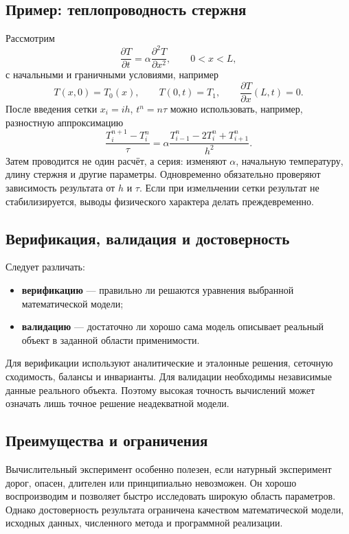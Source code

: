 \subsection{Пример: теплопроводность стержня}

Рассмотрим
\[
\frac{\partial T}{\partial t}
=\alpha\frac{\partial^2T}{\partial x^2},
\qquad 0<x<L,
\]
с начальными и граничными условиями, например
\[
T(x,0)=T_0(x),\qquad
T(0,t)=T_1,
\qquad
\frac{\partial T}{\partial x}(L,t)=0.
\]
После введения сетки $x_i=ih$, $t^n=n\tau$ можно использовать, например,
разностную аппроксимацию
\[
\frac{T_i^{n+1}-T_i^n}{\tau}
=\alpha\frac{T_{i-1}^n-2T_i^n+T_{i+1}^n}{h^2}.
\]
Затем проводится не один расчёт, а серия: изменяют $\alpha$, начальную
температуру, длину стержня и другие параметры. Одновременно обязательно
проверяют зависимость результата от $h$ и $\tau$. Если при измельчении
сетки результат не стабилизируется, выводы физического характера делать
преждевременно.

\subsection{Верификация, валидация и достоверность}

Следует различать:
\begin{itemize}
    \item \textbf{верификацию} --- правильно ли решаются уравнения выбранной
    математической модели;
    \item \textbf{валидацию} --- достаточно ли хорошо сама модель описывает
    реальный объект в заданной области применимости.
\end{itemize}

Для верификации используют аналитические и эталонные решения, сеточную
сходимость, балансы и инварианты. Для валидации необходимы независимые
данные реального объекта. Поэтому высокая точность вычислений может
означать лишь точное решение неадекватной модели.

\subsection{Преимущества и ограничения}

Вычислительный эксперимент особенно полезен, если натурный эксперимент
дорог, опасен, длителен или принципиально невозможен. Он хорошо
воспроизводим и позволяет быстро исследовать широкую область параметров.
Однако достоверность результата ограничена качеством математической
модели, исходных данных, численного метода и программной реализации.


